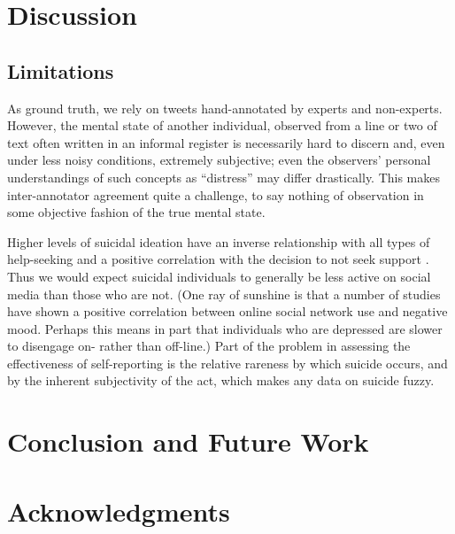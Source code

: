 \documentclass[11pt]{article}
\begin{document}
\section{Discussion}
\subsection{Limitations}
As ground truth, we rely on tweets hand-annotated by experts and non-experts. However, the mental state of another individual, observed from a line or two of text  often written in an informal register is necessarily hard to discern and, even under less noisy conditions, extremely subjective; even the observers' personal understandings of such concepts as ``distress'' may differ drastically. This makes inter-annotator agreement quite a challenge, to say nothing of observation in some objective fashion of the true mental state.


Higher levels of suicidal ideation have an inverse relationship with all types of help-seeking and a positive correlation with the decision to not seek support \cite{deane2001suicidal}. Thus we would expect suicidal individuals to generally be less active on social media than those who are not. (One ray of sunshine is that a number of studies have shown a positive correlation between online social network use and negative mood. Perhaps this means in part that individuals who are depressed are slower to disengage on- rather than off-line.)
 Part of the problem in assessing the effectiveness of self-reporting is the relative rareness by which suicide occurs, and by the inherent subjectivity of the act, which makes any data on suicide fuzzy.
 
\section{Conclusion and Future Work}
\section*{Acknowledgments}





\end{document}
